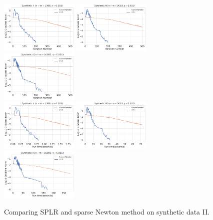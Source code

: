 \documentclass{article}
\theoremstyle{plain}
\theoremstyle{definition}
\theoremstyle{remark}
\begin{document}
\begin{figure}[!h]
    \centering
    \includegraphics[width=0.33\textwidth]{save/Synthetic II - Ablation/iterations/n=1000, m=1000, reg=0.001}
    \includegraphics[width=0.33\textwidth]{save/Synthetic II - Ablation/iterations/n=5000, m=5000, reg=0.001}
    \includegraphics[width=0.33\textwidth]{save/Synthetic II - Ablation/iterations/n=10000, m=10000, reg=0.001}\\
    \includegraphics[width=0.33\textwidth]{save/Synthetic II - Ablation/run_times/n=1000, m=1000, reg=0.001}
    \includegraphics[width=0.33\textwidth]{save/Synthetic II - Ablation/run_times/n=5000, m=5000, reg=0.001}
    \includegraphics[width=0.33\textwidth]{save/Synthetic II - Ablation/run_times/n=10000, m=10000, reg=0.001}
    \caption{Comparing SPLR and sparse Newton method on synthetic data II.}
    \label{fig:effect_low_rank_ii}
\end{figure}
\end{document}
